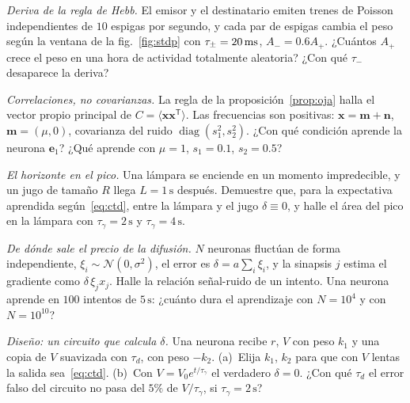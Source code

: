 \begin{exercise}[\lvlA]
\label{ex:06:2}
\emph{Deriva de la regla de Hebb.} El emisor y el destinatario emiten trenes de Poisson independientes de $10$ espigas por segundo, y cada par de espigas cambia el peso según la ventana de la fig.~\ref{fig:stdp} con $\tau_\pm=20\,\text{ms}$, $A_-=0.6A_+$. ¿Cuántos $A_+$ crece el peso en una hora de actividad totalmente aleatoria? ¿Con qué $\tau_-$ desaparece la deriva?
\end{exercise}

\begin{exercise}[\lvlB]
\label{ex:06:3}
\emph{Correlaciones, no covarianzas.} La regla de la proposición~\ref{prop:oja} halla el vector propio principal de $C=\langle\mathbf x\mathbf x^{\mathsf T}\rangle$. Las frecuencias son positivas: $\mathbf x=\mathbf m+\mathbf n$, $\mathbf m=(\mu,0)$, covarianza del ruido $\operatorname{diag}(s_1^2,s_2^2)$. ¿Con qué condición aprende la neurona $\mathbf e_1$? ¿Qué aprende con $\mu=1$, $s_1=0.1$, $s_2=0.5$?
\end{exercise}

\begin{exercise}[\lvlA]
\label{ex:06:4}
\emph{El horizonte en el pico.} Una lámpara se enciende en un momento impredecible, y un jugo de tamaño $R$ llega $L=1\,\text{s}$ después. Demuestre que, para la expectativa aprendida según~\eqref{eq:ctd}, entre la lámpara y el jugo $\delta\equiv0$, y halle el área del pico en la lámpara con $\tau_\gamma=2\,\text{s}$ y $\tau_\gamma=4\,\text{s}$.
\end{exercise}

\begin{exercise}[\lvlB]
\label{ex:06:5}
\emph{De dónde sale el precio de la difusión.} $N$ neuronas fluctúan de forma independiente, $\xi_i\sim\mathcal N(0,\sigma^2)$, el error es $\delta=a\sum_i\xi_i$, y la sinapsis $j$ estima el gradiente como $\delta\,\xi_jx_j$. Halle la relación señal-ruido de un intento. Una neurona aprende en $100$ intentos de $5\,\text{s}$: ¿cuánto dura el aprendizaje con $N=10^4$ y con $N=10^{10}$?
\end{exercise}

\begin{exercise}[\lvlB]
\label{ex:06:6}
\emph{Diseño: un circuito que calcula $\delta$.} Una neurona  recibe $r$, $V$ con peso $k_1$ y una copia de $V$ suavizada con $\tau_d$, con peso $-k_2$. (a)~Elija $k_1$, $k_2$ para que con $V$ lentas la salida sea~\eqref{eq:ctd}. (b)~Con $V=V_0e^{t/\tau_\gamma}$ el verdadero $\delta=0$. ¿Con qué $\tau_d$ el error falso del circuito no pasa del $5\%$ de $V/\tau_\gamma$, si $\tau_\gamma=2\,\text{s}$?
\end{exercise}

